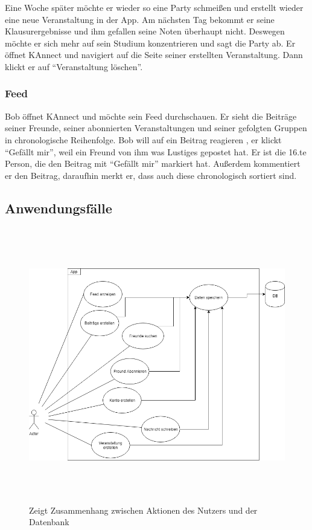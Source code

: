 \documentclass[parskip=full]{scrartcl}
\begin{document}
	Eine Woche später möchte er wieder so eine Party schmeißen und erstellt wieder eine neue Veranstaltung in der \gls{App}. Am nächsten Tag bekommt er seine Klausurergebnisse und ihm gefallen seine Noten überhaupt nicht. Deswegen möchte er sich mehr auf sein Studium konzentrieren und sagt die Party ab. Er öffnet KAnnect und navigiert auf die Seite seiner erstellten Veranstaltung. Dann klickt er auf “Veranstaltung löschen”.
	
	\subsubsection{\gls{Feed}}
	Bob öffnet KAnnect und möchte sein \gls{Feed} durchschauen. Er sieht die Beiträge seiner Freunde, seiner abonnierten Veranstaltungen und seiner gefolgten Gruppen in chronologische Reihenfolge.
	Bob will auf ein Beitrag reagieren , er klickt “Gefällt mir”, weil ein Freund von ihm was Lustiges gepostet hat. Er ist die 16.te Person, die den Beitrag mit “Gefällt mir” markiert hat. Außerdem kommentiert er den Beitrag, daraufhin merkt er, dass auch diese chronologisch sortiert sind.
	
	\newpage
	\subsection{Anwendungsfälle}
	
		\begin{figure}[H]
			\centering
			\includegraphics[height=12cm]{Anwendungsfalldiagramm}
			\caption{Zeigt Zusammenhang zwischen Aktionen des Nutzers und der Datenbank}
			\label{Anwendungsfalldiagramm}
		\end{figure}
		
\end{document}
